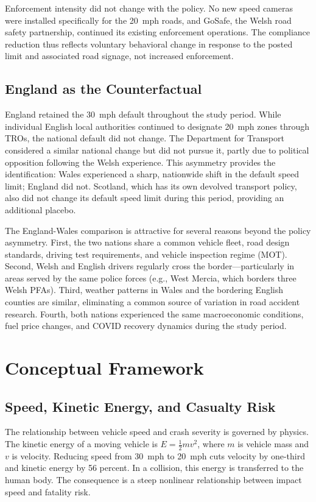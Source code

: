 \documentclass[12pt]{article}
\begin{document}
Enforcement intensity did not change with the policy. No new speed cameras were installed specifically for the 20~mph roads, and GoSafe, the Welsh road safety partnership, continued its existing enforcement operations. The compliance reduction thus reflects voluntary behavioral change in response to the posted limit and associated road signage, not increased enforcement.

\subsection{England as the Counterfactual}

England retained the 30~mph default throughout the study period. While individual English local authorities continued to designate 20~mph zones through TROs, the national default did not change. The Department for Transport considered a similar national change but did not pursue it, partly due to political opposition following the Welsh experience. This asymmetry provides the identification: Wales experienced a sharp, nationwide shift in the default speed limit; England did not. Scotland, which has its own devolved transport policy, also did not change its default speed limit during this period, providing an additional placebo.

The England-Wales comparison is attractive for several reasons beyond the policy asymmetry. First, the two nations share a common vehicle fleet, road design standards, driving test requirements, and vehicle inspection regime (MOT). Second, Welsh and English drivers regularly cross the border---particularly in areas served by the same police forces (e.g., West Mercia, which borders three Welsh PFAs). Third, weather patterns in Wales and the bordering English counties are similar, eliminating a common source of variation in road accident research. Fourth, both nations experienced the same macroeconomic conditions, fuel price changes, and COVID recovery dynamics during the study period.


\section{Conceptual Framework}
\label{sec:framework}

\subsection{Speed, Kinetic Energy, and Casualty Risk}

The relationship between vehicle speed and crash severity is governed by physics. The kinetic energy of a moving vehicle is $E = \frac{1}{2}mv^2$, where $m$ is vehicle mass and $v$ is velocity. Reducing speed from 30~mph to 20~mph cuts velocity by one-third and kinetic energy by 56 percent. In a collision, this energy is transferred to the human body. The consequence is a steep nonlinear relationship between impact speed and fatality risk.
\end{document}

